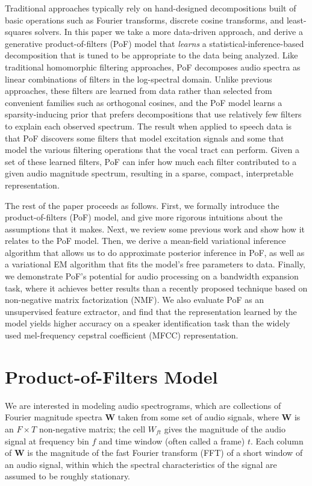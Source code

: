 \documentclass{article} %
\begin{document}
Traditional approaches typically rely on hand-designed decompositions
built of basic operations such as Fourier transforms, discrete cosine
transforms, and least-squares solvers. In this paper we take a more
data-driven approach, and derive a generative product-of-filters (PoF)
model that \emph{learns} a statistical-inference-based decomposition
that is tuned to be appropriate to the data being analyzed. Like
traditional homomorphic filtering approaches, PoF decomposes audio
spectra as linear combinations of filters in the log-spectral
domain. Unlike previous approaches, these filters are learned from
data rather than selected from convenient families such as orthogonal
cosines, and the PoF model learns a sparsity-inducing prior that
prefers decompositions that use relatively few filters to explain each
observed spectrum. The result when applied to speech data is that PoF
discovers some filters that model excitation signals and some that
model the various filtering operations that the vocal tract can
perform. Given a set of these learned filters, PoF can infer how much
each filter contributed to a given audio magnitude spectrum, resulting
in a sparse, compact, interpretable representation.

The rest of the paper proceeds as follows. First, we formally
introduce the product-of-filters (PoF) model, and give more rigorous
intuitions about the assumptions that it makes. Next, we review some
previous work and show how it relates to the PoF model. Then, we derive
a mean-field variational inference algorithm that allows us to do
approximate posterior inference in PoF, as well as a variational EM
algorithm that fits the model's free parameters to data. Finally, we
demonstrate PoF's potential for audio processing on a bandwidth
expansion task, where it achieves better results than a recently
proposed technique based on non-negative matrix factorization (NMF). We also
evaluate PoF as an unsupervised feature extractor, and find that the
representation learned by the model yields higher accuracy on a
speaker identification task than the widely used mel-frequency
cepstral coefficient (MFCC) representation.

\section{Product-of-Filters Model}\label{sec:sf_prior}

We are interested in modeling audio spectrograms, which are collections of Fourier magnitude 
spectra $\mathbf{W}$ taken from some set of audio signals, where
$\mathbf{W}$ is an $F\times T$ non-negative matrix; the cell $W_{ft}$
gives the magnitude of the audio signal at frequency bin $f$
and time window (often called a frame) $t$. Each column of
$\mathbf{W}$ is the magnitude of the
fast Fourier transform (FFT) of a short window of an audio
signal, within which the spectral characteristics of the signal are
assumed to be roughly stationary.
\end{document}
